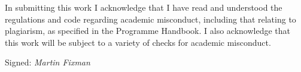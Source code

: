 \documentclass[a4paper,11pt]{article}
\begin{document}
In submitting this work I acknowledge that I have read and understood the regulations and code regarding academic misconduct, including that relating to plagiarism, as specified in the Programme Handbook.
I also acknowledge that this work will be subject to a variety of checks for academic misconduct.

Signed: \textsl{Martin Fixman}

\clearpage{}


\clearpage{}
\tableofcontents{}

\clearpage{}


\clearpage{}


\clearpage{}


\clearpage{}


\clearpage{}



\clearpage{}



\clearpage{}


\clearpage{}
\begin{small}
	
\end{small}

\clearpage{}

\appendixpage{}
\appendix{}



\clearpage{}




\end{document}
